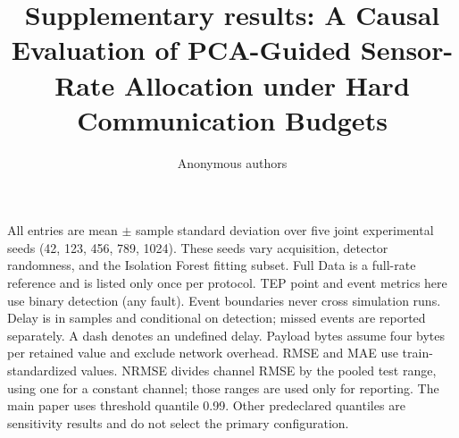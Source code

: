 \documentclass[11pt]{article}
\begin{document}
\title{Supplementary results: A Causal Evaluation of PCA-Guided Sensor-Rate Allocation under Hard Communication Budgets}
\author{Anonymous authors}
\date{}
\maketitle
\noindent All entries are mean $\pm$ sample standard deviation over five joint
experimental seeds (42, 123, 456, 789, 1024). These seeds vary acquisition,
detector randomness, and the Isolation Forest fitting subset. Full Data is a
full-rate reference and is listed only once per protocol. TEP point and event
metrics here use binary detection (any fault). Event boundaries never cross
simulation runs. Delay is in samples and conditional on detection; missed events
are reported separately. A dash denotes an undefined delay. Payload bytes
assume four bytes per retained value and exclude network overhead. RMSE and MAE
use train-standardized values. NRMSE divides channel RMSE by the pooled test
range, using one for a constant channel; those ranges are used only for reporting.
The main paper uses threshold quantile 0.99. Other predeclared quantiles are
sensitivity results and do not select the primary configuration.
\clearpage


\end{document}

